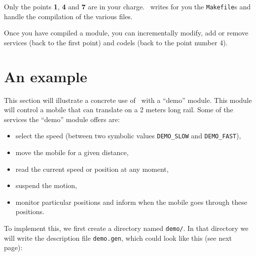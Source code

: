 Only the points {\bf 1}, {\bf 4} and {\bf  7} are in your charge. \GenoM\
writes for you   the {\tt Makefile}s  and  handle the compilation of  the
various files.

Once you have  compiled a module,  you  can incrementally modify, add  or
remove services (back to  the first point) and  codels (back to the point
number 4).

\section{An example}
\label{sec|session|example}

This section will  illustrate a concrete use  of \GenoM\ with  a ``demo''
module. This module  will  control a  mobile that  can translate  on  a 2
meters long rail. Some of the services the ``demo'' module offers are:

\begin{itemize}
   \item select the speed (between two symbolic values {\tt DEMO\_SLOW}
and {\tt DEMO\_FAST}),
   \item move the mobile for a given distance,
   \item read the current speed or position at any moment,
   \item suspend the motion,
   \item monitor particular positions and inform when the mobile goes
through these positions.
\end{itemize}

To implement this, we first create a directory named {\tt demo/}. In that
directory we will write the description file {\tt demo.gen}, which could
look like this (see next page):
\vfill\eject


